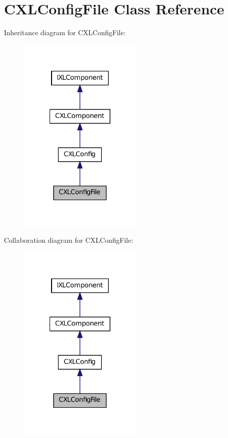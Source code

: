\hypertarget{classCXLConfigFile}{
\section{CXLConfigFile Class Reference}
\label{classCXLConfigFile}
}


Inheritance diagram for CXLConfigFile:\nopagebreak
\begin{figure}[H]
\begin{center}
\leavevmode
\includegraphics[width=170pt]{classCXLConfigFile__inherit__graph}
\end{center}
\end{figure}


Collaboration diagram for CXLConfigFile:\nopagebreak
\begin{figure}[H]
\begin{center}
\leavevmode
\includegraphics[width=170pt]{classCXLConfigFile__coll__graph}
\end{center}
\end{figure}
